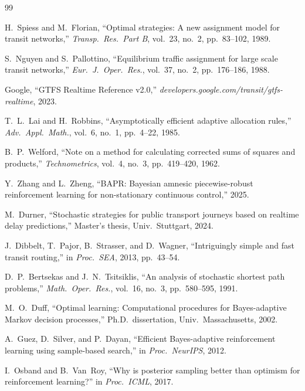 \documentclass[11pt]{article}
\theoremstyle{definition}
\theoremstyle{remark}
\begin{document}

\begin{thebibliography}{99}

H.~Spiess and M.~Florian, ``Optimal strategies: A new assignment model for transit networks,'' \emph{Transp.\ Res.\ Part B}, vol.~23, no.~2, pp.~83--102, 1989.

S.~Nguyen and S.~Pallottino, ``Equilibrium traffic assignment for large scale transit networks,'' \emph{Eur.\ J.\ Oper.\ Res.}, vol.~37, no.~2, pp.~176--186, 1988.

Google, ``GTFS Realtime Reference v2.0,'' \emph{developers.google.com/transit/gtfs-realtime}, 2023.

T.~L.~Lai and H.~Robbins, ``Asymptotically efficient adaptive allocation rules,'' \emph{Adv.\ Appl.\ Math.}, vol.~6, no.~1, pp.~4--22, 1985.

B.~P.~Welford, ``Note on a method for calculating corrected sums of squares and products,'' \emph{Technometrics}, vol.~4, no.~3, pp.~419--420, 1962.

Y.~Zhang and L.~Zheng, ``BAPR: Bayesian amnesic piecewise-robust reinforcement learning for non-stationary continuous control,'' 2025.

M.~Durner, ``Stochastic strategies for public transport journeys based on realtime delay predictions,'' Master's thesis, Univ.\ Stuttgart, 2024.

J.~Dibbelt, T.~Pajor, B.~Strasser, and D.~Wagner, ``Intriguingly simple and fast transit routing,'' in \emph{Proc.\ SEA}, 2013, pp.~43--54.

D.~P.~Bertsekas and J.~N.~Tsitsiklis, ``An analysis of stochastic shortest path problems,'' \emph{Math.\ Oper.\ Res.}, vol.~16, no.~3, pp.~580--595, 1991.

M.~O.~Duff, ``Optimal learning: Computational procedures for Bayes-adaptive Markov decision processes,'' Ph.D.\ dissertation, Univ.\ Massachusetts, 2002.

A.~Guez, D.~Silver, and P.~Dayan, ``Efficient Bayes-adaptive reinforcement learning using sample-based search,'' in \emph{Proc.\ NeurIPS}, 2012.

I.~Osband and B.~Van~Roy, ``Why is posterior sampling better than optimism for reinforcement learning?'' in \emph{Proc.\ ICML}, 2017.


\end{thebibliography}
\end{document}
